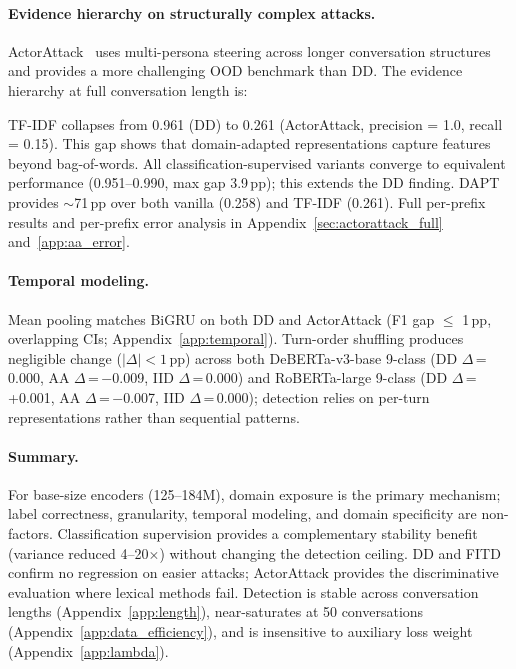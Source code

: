 \paragraph{Evidence hierarchy on structurally complex attacks.}
ActorAttack~\citep{ren2024actorattack} uses multi-persona steering across longer conversation structures and provides a more challenging OOD benchmark than DD.
The evidence hierarchy at full conversation length is:

\vspace{2pt}
\noindent\hspace{0.5em}{\small TF-IDF (0.261) $\approx$ vanilla (0.258$\pm$0.000) $<$ topic (0.625$\pm$0.141) $<$ wiki-MLM (0.686$\pm$0.297) $<$ jb-MLM (0.893$\pm$0.080) $<$ scrambled (0.951$\pm$0.043) $\approx$ 9-class (0.972$\pm$0.026) $\approx$ binary (0.990$\pm$0.008)}
\vspace{2pt}

TF-IDF collapses from 0.961 (DD) to 0.261 (ActorAttack, precision = 1.0, recall = 0.15). This gap shows that domain-adapted representations capture features beyond bag-of-words.
All classification-supervised variants converge to equivalent performance (0.951--0.990, max gap 3.9\,pp); this extends the DD finding. DAPT provides $\sim$71\,pp over both vanilla (0.258) and TF-IDF (0.261). Full per-prefix results and per-prefix error analysis in Appendix~\ref{sec:actorattack_full} and~\ref{app:aa_error}.

\paragraph{Temporal modeling.}
Mean pooling matches BiGRU on both DD and ActorAttack (F1 gap $\leq$ 1\,pp, overlapping CIs; Appendix~\ref{app:temporal}).
Turn-order shuffling produces negligible change ($|\Delta| < 1$\,pp) across both DeBERTa-v3-base 9-class (DD $\Delta$\,=\,0.000, AA $\Delta$\,=\,$-$0.009, IID $\Delta$\,=\,0.000) and RoBERTa-large 9-class (DD $\Delta$\,=\,+0.001, AA $\Delta$\,=\,$-$0.007, IID $\Delta$\,=\,0.000); detection relies on per-turn representations rather than sequential patterns.

\paragraph{Summary.}
For base-size encoders (125--184M), domain exposure is the primary mechanism; label correctness, granularity, temporal modeling, and domain specificity are non-factors. Classification supervision provides a complementary stability benefit (variance reduced 4--20$\times$) without changing the detection ceiling.
DD and FITD confirm no regression on easier attacks; ActorAttack provides the discriminative evaluation where lexical methods fail.
Detection is stable across conversation lengths (Appendix~\ref{app:length}), near-saturates at 50 conversations (Appendix~\ref{app:data_efficiency}), and is insensitive to auxiliary loss weight (Appendix~\ref{app:lambda}).

